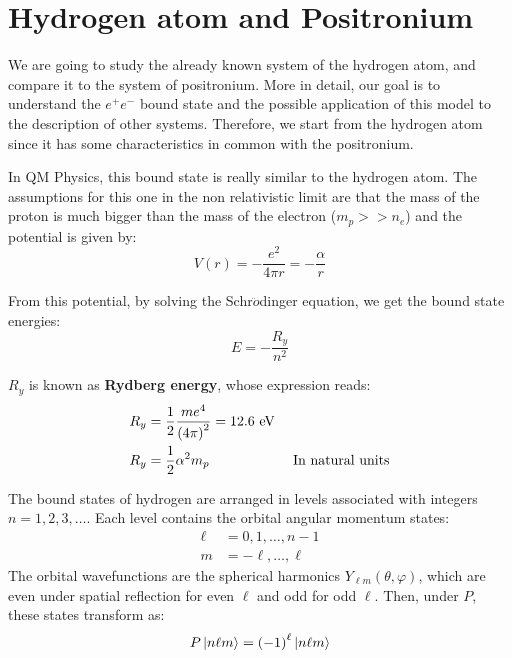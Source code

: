 \documentclass[../../main/main.tex]{subfiles}
\begin{document}

\section{Hydrogen atom and Positronium}
We are going to study the already known system of the hydrogen atom, and compare it to the system of positronium. More in detail, our goal is to understand the \( e^+ e^- \) bound state and the possible application of this model to the description of other systems. Therefore, we start from the hydrogen atom since it has some characteristics in common with the positronium.

In QM Physics, this bound state is really similar to the hydrogen atom. The assumptions for this one in the non relativistic limit are that the mass of the proton is much bigger than the mass of the electron (\( m_p >> n_e \)) and the potential is given by:
\begin{equation}
    V(r)
    =
    - \frac{e^2}{4 \pi r}
    =
    - \frac{\alpha}{r}
    \label{eq:L02_HAP}
\end{equation}

From this potential, by solving the Schr$\ddot{o}$dinger equation, we get the bound state energies:
\begin{equation}
    E
    =
    - \frac{R_y}{n^2}
    \label{eq:L02_HAE}
\end{equation}

\( R_y \) is known as \textbf{Rydberg energy}, whose expression reads:
\begin{align}
    R_y &= \frac{1}{2} \frac{me^4}{\qty(4\pi)^2} = 12.6 \ \si{eV} \label{eq:L02_HARE} \\
    R_y &= \frac{1}{2} \alpha^2 m_p \qquad \qquad \qquad \text{In natural units} \label{eq:L02_HARENU}
\end{align}

The bound states of hydrogen are arranged in levels associated with integers \( n = 1,2,3, \dots \). Each level contains the orbital angular momentum states:
\begin{equation}
    \begin{aligned}
        \ell &= 0, 1, \dots, n-1 \\
        m    &= -\ell, \dots, \ell
    \end{aligned}
    \label{eq:L02_HAREMS}
\end{equation}
The orbital wavefunctions are the spherical harmonics \( Y_{\ell m}(\theta, \varphi) \), which are even under spatial reflection for even \( \ell \) and odd for odd \( \ell \). Then, under \( P \), these states transform as:
\begin{equation}
    P \ket{n \ell m} = \qty(-1)^{\ell} \ket{n \ell m}
    \label{eq:L02_HAWFP}
\end{equation}
\end{document}
